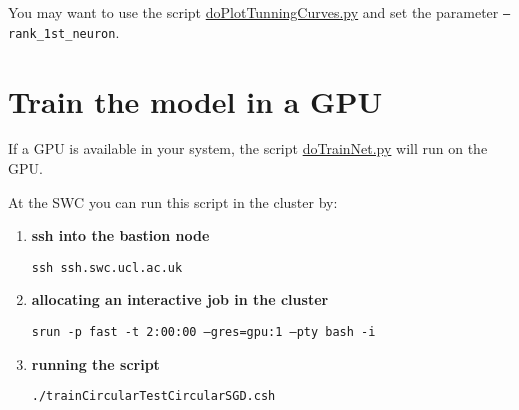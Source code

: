\documentclass[12pt]{article}
\begin{document}
You may want to use the script
\href{https://github.com/joacorapela/statNeuro2025/blob/master/worksheets/08_artificialNeuralNetworks/code/scripts/doPlotTunningCurves.py}{doPlotTunningCurves.py}
and set the parameter \texttt{--rank\_1st\_neuron}.

\section{Train the model in a GPU}

If a GPU is available in your system, the script
\href{https://github.com/joacorapela/statNeuro2025/blob/master/worksheets/08_artificialNeuralNetworks/code/scripts/doTrainNet.py}{doTrainNet.py}
will run on the GPU.

At the SWC you can run this script in the cluster by:

\begin{enumerate}

    \item \textbf{ssh into the bastion node}

        \texttt{ssh ssh.swc.ucl.ac.uk}

    \item \textbf{allocating an interactive job in the cluster}

        \texttt{srun -p fast -t 2:00:00 --gres=gpu:1 --pty bash -i}

    \item \textbf{running the script}

        \texttt{./trainCircularTestCircularSGD.csh}

\end{enumerate}
\end{document}
